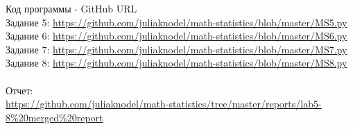 Код программы - GitHub URL  \\
Задание 5: \url{https://github.com/juliaknodel/math-statistics/blob/master/MS5.py}\\
Задание 6: \url{https://github.com/juliaknodel/math-statistics/blob/master/MS6.py}\\
Задание 7: \url{https://github.com/juliaknodel/math-statistics/blob/master/MS7.py}\\
Задание 8: \url{https://github.com/juliaknodel/math-statistics/blob/master/MS8.py}\\
\\
Отчет:\\ \url{https://github.com/juliaknodel/math-statistics/tree/master/reports/lab5-8%20merged%20report}